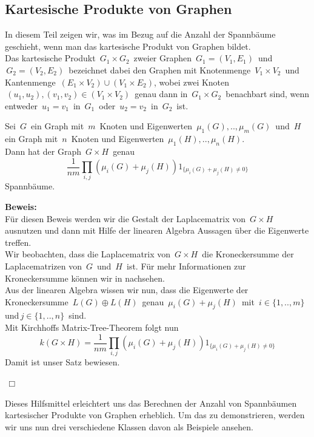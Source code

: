 \subsection{Kartesische Produkte von Graphen}
In diesem Teil zeigen wir, was im Bezug auf die Anzahl der Spannbäume geschieht, wenn man das kartesische Produkt von Graphen bildet.\\
Das kartesische Produkt $\,G_1\times G_2\,$ zweier Graphen $\,G_1=(V_1,E_1)\,$ und $\,G_2=(V_2,E_2)\,$ bezeichnet dabei den Graphen mit Knotenmenge $\,V_1\times V_2\,$ und Kantenmenge $\,(E_1\times V_2)\cup(V_1\times E_2)$,\; wobei zwei Knoten $\,(u_1,u_2), (v_1,v_2) \in (V_1\times V_2)\,$ genau dann in $\,G_1\times G_2\,$ benachbart sind, wenn entweder $\,u_1=v_1\,$ in $\,G_1\,$ oder $\,u_2=v_2\,$ in $\,G_2\,$ ist.\\
\begin{Tms}
 Sei $\,G\,$ ein Graph mit $\,m\,$ Knoten und Eigenwerten $\,\mu_1(G),..,\mu_m(G)\,$ und $\,H\,$ ein Graph mit $\,n\,$ Knoten und Eigenwerten $\,\mu_1(H),..,\mu_n(H)$.\;  \\
Dann hat der Graph $\,G \times H\,$ genau
\begin{equation*}
\frac{1}{nm}\displaystyle\prod_{i,j}(\mu_i(G)+\mu_j(H))1_{\{\mu_i(G)+\mu_j(H)\neq0\}}
\end{equation*}
Spannbäume.
\label{tmcpG}
\end{Tms}
\textbf{Beweis:}\\
Für diesen Beweis werden wir die Gestalt der Laplacematrix von $\,G \times H\,$ ausnutzen und dann mit Hilfe der linearen Algebra Aussagen über die Eigenwerte treffen.\\
Wir beobachten, dass die Laplacematrix von $\,G\times H\,$ die Kroneckersumme der Laplacematrizen von $\,G\,$ und $\,H\,$ ist. Für mehr Informationen zur Kroneckersumme können wir in \cite{horn_johnson_1991} nachsehen.\\
Aus der linearen Algebra wissen wir nun, dass die Eigenwerte der Kroneckersumme $\,L(G) \oplus L(H)\,$ genau $\,\mu_i(G)+\mu_j(H)\,$ mit $\,i \in \{ 1,..,m\}\,$ und$\, j \in \{ 1,..,n\}\,$ sind.\\
Mit Kirchhoffs Matrix-Tree-Theorem folgt nun
\begin{equation*}
 \mathit{k}(G \times H) = \frac{1}{nm}\displaystyle\prod_{i,j}(\mu_i(G)+\mu_j(H))1_{\{\mu_i(G)+\mu_j(H)\neq0\}}
\end{equation*}
Damit ist unser Satz bewiesen.
\begin{flushright} $\,\Box\,$ \end{flushright} 
Dieses Hilfsmittel erleichtert uns das Berechnen der Anzahl von Spannbäumen kartesischer Produkte von Graphen erheblich. Um das zu demonstrieren, werden wir uns nun drei verschiedene Klassen davon als Beispiele ansehen.

